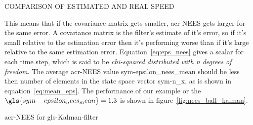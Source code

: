 \begin{RoyalFigure}[!htb, label=fig:speed_ball_kalman]{COMPARISON OF ESTIMATED AND REAL SPEED}
\end{RoyalFigure}


This means that if the covariance matrix gets smaller, \gls{acr-NEES} gets larger for the same error. A covariance
matrix is the filter's estimate of it's error, so if it's small relative to the estimation error then it's performing
worse than if it's large relative to the same estimation error. Equation~\ref{eq:eps_nees} gives a scalar for each time
step, which is said to be \textit{chi-squared distributed with n degrees of freedom}. The average \gls{acr-NEES} value
\gls{sym-epsilon_nees_mean} should be less then number of elements in the state space vector \gls{sym-n_x}, as is shown
in equation~\ref{eq:mean_eps}. The performance of our example or the \( \gls{sym-epsilon_nees_mean} = \num{1.307745} \)
is shown in figure~\ref{fig:nees_ball_kalman}.

\begin{RoyalFigure}[!htb, label=fig:nees_ball_kalman]{\gls{acr-NEES} for \gls{gls-Kalman-filter}}
\end{RoyalFigure}
